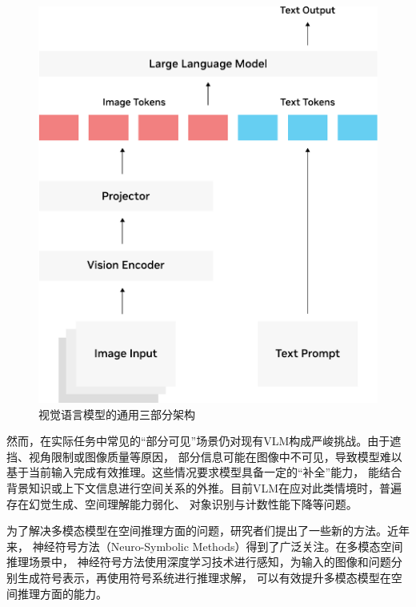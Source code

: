 \begin{figure}[htb]
    \centering
    \includegraphics[scale=0.6]{figures/vlm-architecture-diagram-crop.pdf}
    \caption{视觉语言模型的通用三部分架构}
    \label{fig:vlm-architecture}
\end{figure}

然而，在实际任务中常见的“部分可见”场景仍对现有VLM构成严峻挑战。由于遮挡、视角限制或图像质量等原因，
部分信息可能在图像中不可见，导致模型难以基于当前输入完成有效推理。这些情况要求模型具备一定的“补全”能力，
能结合背景知识或上下文信息进行空间关系的外推。目前VLM在应对此类情境时，普遍存在幻觉生成、空间理解能力弱化、
对象识别与计数性能下降等问题\cite{vardi2025clipupclipbasedunanswerableproblem, chen2024spatialvlmendowingvisionlanguagemodels, campbell2024understandinglimitsvisionlanguage}。

为了解决多模态模型在空间推理方面的问题，研究者们提出了一些新的方法。近年来，
神经符号方法（Neuro-Symbolic Methods）得到了广泛关注。在多模态空间推理场景中，
神经符号方法使用深度学习技术进行感知，为输入的图像和问题分别生成符号表示，再使用符号系统进行推理求解，
可以有效提升多模态模型在空间推理方面的能力\cite{premsri2025neurosymbolictrainingreasoningspatial}。

